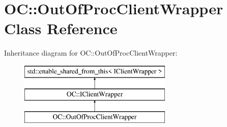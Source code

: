 \hypertarget{classOC_1_1OutOfProcClientWrapper}{}\section{O\+C\+:\+:Out\+Of\+Proc\+Client\+Wrapper Class Reference}
\label{classOC_1_1OutOfProcClientWrapper}
Inheritance diagram for O\+C\+:\+:Out\+Of\+Proc\+Client\+Wrapper\+:\begin{figure}[H]
\begin{center}
\leavevmode
\includegraphics[height=3.000000cm]{classOC_1_1OutOfProcClientWrapper}
\end{center}
\end{figure}
